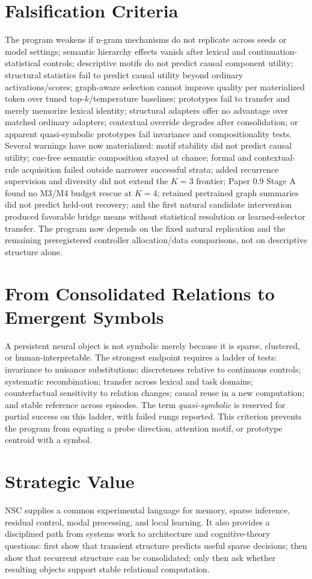 \documentclass[11pt]{article}
\begin{document}
\section{Falsification Criteria}
The program weakens if n-gram mechanisms do not replicate across seeds or model settings; semantic hierarchy effects vanish after lexical and continuation-statistical controls; descriptive motifs do not predict causal component utility; structural statistics fail to predict causal utility beyond ordinary activations/scores; graph-aware selection cannot improve quality per materialized token over tuned top-$k$/temperature baselines; prototypes fail to transfer and merely memorize lexical identity; structural adapters offer no advantage over matched ordinary adapters; contextual override degrades after consolidation; or apparent quasi-symbolic prototypes fail invariance and compositionality tests. Several warnings have now materialized: motif stability did not predict causal utility; cue-free semantic composition stayed at chance; formal and contextual-rule acquisition failed outside narrower successful strata; added recurrence supervision and diversity did not extend the $K=3$ frontier; Paper 0.9 Stage A found no M3/M4 budget rescue at $K=4$; retained pretrained graph summaries did not predict held-out recovery; and the first natural candidate intervention produced favorable bridge means without statistical resolution or learned-selector transfer. The program now depends on the fixed natural replication and the remaining preregistered controller allocation/data comparisons, not on descriptive structure alone.

\section{From Consolidated Relations to Emergent Symbols}
A persistent neural object is not symbolic merely because it is sparse, clustered, or human-interpretable. The strongest endpoint requires a ladder of tests: invariance to nuisance substitutions; discreteness relative to continuous controls; systematic recombination; transfer across lexical and task domains; counterfactual sensitivity to relation changes; causal reuse in a new computation; and stable reference across episodes. The term \emph{quasi-symbolic} is reserved for partial success on this ladder, with failed rungs reported. This criterion prevents the program from equating a probe direction, attention motif, or prototype centroid with a symbol.

\section{Strategic Value}
NSC supplies a common experimental language for memory, sparse inference, residual control, modal processing, and local learning. It also provides a disciplined path from systems work to architecture and cognitive-theory questions: first show that transient structure predicts useful sparse decisions; then show that recurrent structure can be consolidated; only then ask whether resulting objects support stable relational computation.
\end{document}
